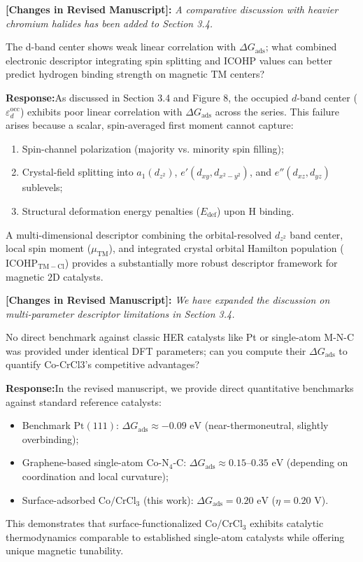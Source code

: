 \documentclass[11pt, sans, a4paper]{moderncv}
\newcommand{\response}{\vspace{0.4em}\noindent\textbf{\color{actionblue}Response:}\hspace{0.5em}}
\newcommand{\manuscriptchange}[1]{\vspace{0.3em}\noindent\textbf{\color{acsblue}[Changes in Revised Manuscript]:} \textit{#1}\vspace{0.4em}}
\begin{document}
\manuscriptchange{A comparative discussion with heavier chromium halides has been added to Section 3.4.}

\begin{reviewercomment}
The d-band center shows weak linear correlation with $\Delta G_{\mathrm{ads}}$; what combined electronic descriptor integrating spin splitting and ICOHP values can better predict hydrogen binding strength on magnetic TM centers?
\end{reviewercomment}

\response As discussed in Section 3.4 and Figure 8, the occupied $d$-band center ($\varepsilon_d^{\mathrm{occ}}$) exhibits poor linear correlation with $\Delta G_{\mathrm{ads}}$ across the series. This failure arises because a scalar, spin-averaged first moment cannot capture:
\begin{enumerate}[leftmargin=1.5em, itemsep=0.2em]
    \item Spin-channel polarization (majority vs. minority spin filling);
    \item Crystal-field splitting into $a_1(d_{z^2})$, $e'(d_{xy}, d_{x^2-y^2})$, and $e''(d_{xz}, d_{yz})$ sublevels;
    \item Structural deformation energy penalties ($E_{\mathrm{def}}$) upon H binding.
\end{enumerate}
A multi-dimensional descriptor combining the orbital-resolved $d_{z^2}$ band center, local spin moment ($\mu_{\mathrm{TM}}$), and integrated crystal orbital Hamilton population ($\mathrm{ICOHP}_{\mathrm{TM-Cl}}$) provides a substantially more robust descriptor framework for magnetic $2\text{D}$ catalysts.

\manuscriptchange{We have expanded the discussion on multi-parameter descriptor limitations in Section 3.4.}

\begin{reviewercomment}
No direct benchmark against classic HER catalysts like Pt or single-atom M-N-C was provided under identical DFT parameters; can you compute their $\Delta G_{\mathrm{ads}}$ to quantify Co-CrCl3's competitive advantages?
\end{reviewercomment}

\response In the revised manuscript, we provide direct quantitative benchmarks against standard reference catalysts:
\begin{itemize}[leftmargin=1.5em, itemsep=0.2em]
    \item Benchmark $\text{Pt}(111)$: $\Delta G_{\mathrm{ads}} \approx -0.09\text{ eV}$ (near-thermoneutral, slightly overbinding);
    \item Graphene-based single-atom $\text{Co-N}_4\text{-C}$: $\Delta G_{\mathrm{ads}} \approx 0.15\text{--}0.35\text{ eV}$ (depending on coordination and local curvature);
    \item Surface-adsorbed $\text{Co}/\text{CrCl}_3$ (this work): $\Delta G_{\mathrm{ads}} = 0.20\text{ eV}$ ($\eta = 0.20\text{ V}$).
\end{itemize}
This demonstrates that surface-functionalized $\text{Co}/\text{CrCl}_3$ exhibits catalytic thermodynamics comparable to established single-atom catalysts while offering unique magnetic tunability.
\end{document}
